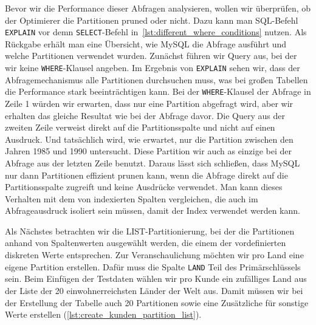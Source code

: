 Bevor wir die Performance dieser Abfragen analysieren, wollen wir überprüfen, ob der Optimierer die Partitionen pruned oder nicht.
Dazu kann man SQL-Befehl \texttt{EXPLAIN} vor demn \texttt{SELECT}-Befehl in~\ref{lst:different_where_conditions} nutzen.
Als Rückgabe erhält man eine Übersicht, wie MySQL die Abfrage ausführt und welche Partitionen verwendet wurden.
Zunächst führen wir Query aus, bei der wir keine \texttt{WHERE}-Klausel angeben.
Im Ergebnis von \texttt{EXPLAIN} sehen wir, dass der Abfragemechanismus alle Partitionen durchsuchen muss, was bei großen Tabellen die Performance stark beeinträchtigen kann.
Bei der \texttt{WHERE}-Klausel der Abfrage in Zeile 1 würden wir erwarten, dass nur eine Partition abgefragt wird, aber wir erhalten das gleiche Resultat wie bei der Abfrage davor.
Die Query aus der zweiten Zeile verweist direkt auf die Partitionsspalte und nicht auf einen Ausdruck.
Und tatsächlich wird, wie erwartet, nur die Partition zwischen den Jahren 1985 und 1990 untersucht.
Diese Partition wir auch as einzige bei der Abfrage aus der letzten Zeile benutzt.
Daraus lässt sich schließen, dass MySQL nur dann Partitionen effizient prunen kann, wenn die Abfrage direkt auf die Partitionsspalte zugreift und keine Ausdrücke verwendet.
Man kann dieses Verhalten mit dem von indexierten Spalten vergleichen, die auch im Abfrageausdruck isoliert sein müssen, damit der Index verwendet werden kann.

Als Nächstes betrachten wir die LIST-Partitionierung, bei der die Partitionen anhand von Spaltenwerten ausgewählt werden, die einem der vordefinierten diskreten Werte entsprechen.
Zur Veranschaulichung möchten wir pro Land eine eigene Partition erstellen.
Dafür muss die Spalte \texttt{LAND} Teil des Primärschlüssels sein.
Beim Einfügen der Testdaten wählen wir pro Kunde ein zufälliges Land aus der Liste der 20 einwohnerreichsten Länder der Welt aus.
Damit müssen wir bei der Erstellung der Tabelle auch 20 Partitionen sowie eine Zusätzliche für sonstige Werte erstellen (\ref{lst:create_kunden_partition_list}).

\vspace{-5pt}

\vspace{-5pt}

